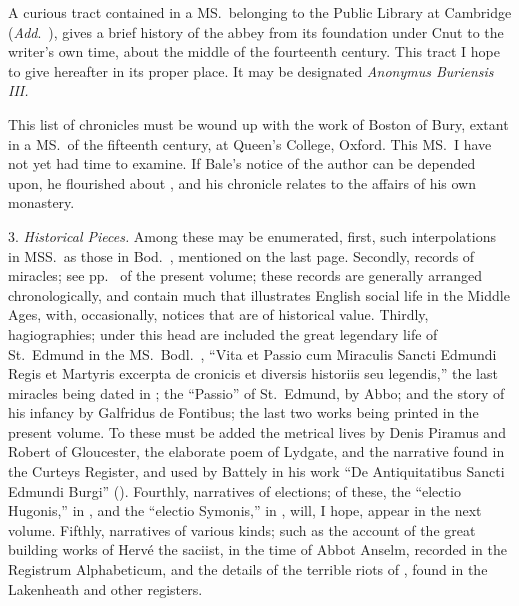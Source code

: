 \documentclass[10pt]{book}
\begin{document}
{A curious tract contained in a MS.\ belonging to the Public Library at Cambridge (\emph{Add}.\ ), gives a brief history of the abbey from its foundation under Cnut to the writer's own time, about the middle of the fourteenth century. This tract I hope to give hereafter in its proper place. It may be designated \emph{Anonymus Buriensis III.}

This list of chronicles must be wound up with the work of Boston of Bury, extant in a MS.\ of the fifteenth century, at Queen's College, Oxford. This MS.\ I have not yet had time to examine. If Bale's notice of the author can be depended upon, he flourished about , and his chronicle relates to the affairs of his own monastery.

3. \emph{Historical Pieces.} Among these may be enumerated, first, such interpolations in MSS.\ as those in Bod.\ , mentioned on the last page. Secondly, records of miracles; see pp.\  of the present volume; these records are generally arranged chronologically, and contain much that illustrates English social life in the Middle Ages, with, occasionally, notices that are of historical value. Thirdly, hagiographies; under this head are included the great legendary life of St.\ Edmund in the MS.\ Bodl.\ , ``Vita et Passio cum Miraculis Sancti Edmundi Regis et Martyris excerpta de cronicis et diversis historiis seu legendis,'' the last miracles being dated in ; the ``Passio'' of St.\ Edmund, by Abbo; and the story of his infancy by Galfridus de Fontibus; the last two works being printed in the present volume. To these must be added the metrical lives by Denis Piramus and Robert of Gloucester, the elaborate poem of Lydgate, and the narrative found in the Curteys Register, and used by Battely in his work ``De Antiquitatibus Sancti Edmundi Burgi'' (). Fourthly, narratives of elections; of these, the ``electio Hugonis,'' in , and the ``electio Symonis,'' in , will, I hope, appear in the next volume. Fifthly, narratives of various kinds; such as the account of the great building works of Hervé the saciist, in the time of Abbot Anselm, recorded in the Registrum Alphabeticum, and the details of the terrible riots of , found in the Lakenheath and other registers.

}
\end{document}
